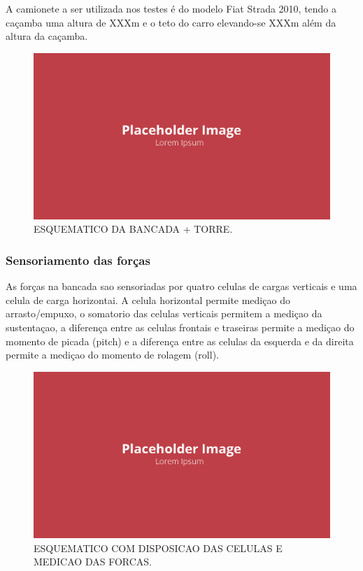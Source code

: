 A camionete a ser utilizada nos testes é do modelo Fiat Strada 2010, tendo a caçamba uma altura de XXXm e o teto do carro elevando-se XXXm além da altura da caçamba.

\begin{figure}[!ht]
    \centering
    \includegraphics[width=.8\linewidth]{figuras/placeholder.png}
    \caption{ESQUEMATICO DA BANCADA + TORRE\cite{autor}.}
    \label{fig:placeholder}
\end{figure}

\subsubsection{Sensoriamento das forças}

As forças na bancada sao sensoriadas por quatro celulas de cargas verticais e uma celula de carga horizontai. A celula horizontal permite mediçao do arrasto/empuxo, o somatorio das celulas verticais permitem a mediçao da sustentaçao, a diferença entre as celulas frontais e traseiras permite a mediçao do momento de picada (pitch) e a diferença entre as celulas da esquerda e da direita permite a mediçao do momento de rolagem (roll).

\begin{figure}[!ht]
    \centering
    \includegraphics[width=.8\linewidth]{figuras/placeholder.png}
    \caption{ESQUEMATICO COM DISPOSICAO DAS CELULAS E MEDICAO DAS FORCAS\cite{autor}.}
    \label{fig:placeholder}
\end{figure}

